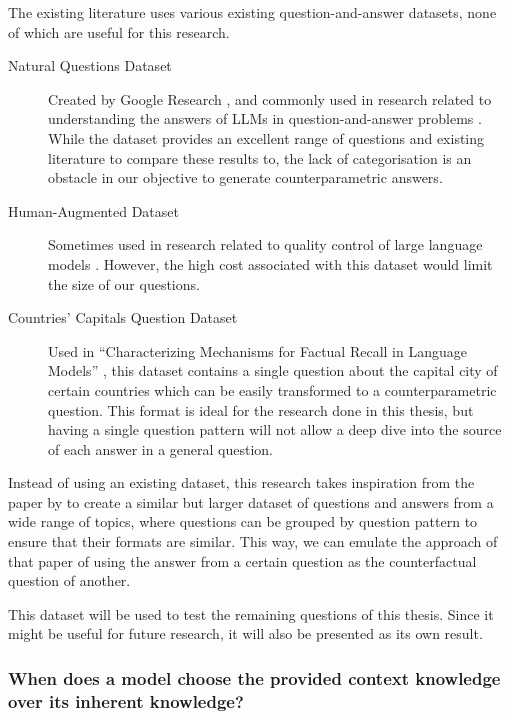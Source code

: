 The existing literature uses various existing question-and-answer datasets, none of which are useful for this research.\footnotemark{}
\begin{description}
	\item[Natural Questions Dataset] Created by Google Research \citep{natural_questions}, and commonly used in research related to understanding the answers of LLMs in question-and-answer problems \citep{ragged,when_not_to_trust_llms,can_rag_models_reason}.
		While the dataset provides an excellent range of questions and existing literature to compare these results to, the lack of categorisation is an obstacle in our objective to generate counterparametric answers.
	\item[Human-Augmented Dataset] Sometimes used in research related to quality control of large language models \citep{learning_the_difference}.
		However, the high cost associated with this dataset would limit the size of our questions.
	\item[Countries' Capitals Question Dataset] Used in ``Characterizing Mechanisms for Factual Recall in Language Models'' \citep{factual_recall}, this dataset contains a single question about the capital city of certain countries which can be easily transformed to a counterparametric question.
		This format is ideal for the research done in this thesis, but having a single question pattern will not allow a deep dive into the source of each answer in a general question.
\end{description}

Instead of using an existing dataset, this research takes inspiration from the paper by \citeauthor{factual_recall} to create a similar but larger dataset of questions and answers from a wide range of topics, where questions can be grouped by question pattern to ensure that their formats are similar.
This way, we can emulate the approach of that paper of using the answer from a certain question as the counterfactual question of another.

This dataset will be used to test the remaining questions of this thesis.
Since it might be useful for future research, it will also be presented as its own result.


\subsubsection{When does a model choose the provided context knowledge over its inherent knowledge?}
\label{intro_models_numbers}


